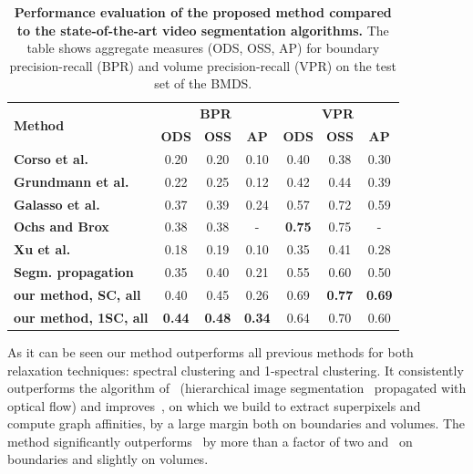 \begin{table}[htbp]
\renewcommand{\arraystretch}{1.3}
\centering
\scriptsize
\begin{tabular}{|l||c|c|c||c|c|c||}
\hline 
\multirow{2}{*}{\textbf{Method}} & \multicolumn{3}{c||}{\textbf{BPR}} & \multicolumn{3}{c||}{\textbf{VPR}}\\
\cline{2-7}
& \textbf{ODS}  & \textbf{OSS} & \textbf{AP}
& \textbf{ODS} & \textbf{OSS} & \textbf{AP}\\
\hline
\hline
\textbf{Corso et al.~\cite{Corso}} & 0.20 & 0.20 & 0.10 & 0.40 &0.38 & 0.30 \\
\hline 
\textbf{Grundmann et al.~\cite{Grundmann10}} & 0.22 & 0.25 & 0.12 & 0.42 & 0.44 & 0.39\\
\hline
\textbf{Galasso et al.~\cite{GalassoCS12}} & 0.37 & 0.39 & 0.24 & 0.57 &0.72 & 0.59 \\
\hline
\textbf{Ochs and Brox~\cite{Ochs11,Ochs12}} & 0.38 & 0.38 & - & \textbf{0.75} & 0.75 & - \\
\hline
\textbf{Xu et al.~\cite{XuXiong12}} & 0.18 & 0.19 & 0.10 & 0.35 & 0.41 & 0.28 \\
\hline
\textbf{Segm. propagation~\cite{Galasso13}} & 0.35 & 0.40 & 0.21 & 0.55 & 0.60 & 0.50 \\
\hline\hline
\textbf{our method, SC, all} & 0.40 & 0.45 & 0.26 & 0.69 & \textbf{0.77} & \textbf{0.69} \\
\hline
\textbf{our method, 1SC, all} & \textbf{0.44} & \textbf{0.48} & \textbf{0.34} & 0.64 & 0.70 & 0.60 \\
\hline
\end{tabular}
 \caption{{\bf Performance evaluation of the proposed method compared to the state-of-the-art video segmentation algorithms.} 
The table shows aggregate measures (ODS, OSS, AP) for boundary precision-recall (BPR) and volume precision-recall (VPR) on the test set of the BMDS.}
\label{tab:ml_other_comparison}
\end{table}

As it can be seen our method outperforms all previous methods for both relaxation techniques: spectral clustering and 1-spectral clustering. 
It consistently outperforms the algorithm of~\cite{Galasso13} (hierarchical image segmentation~\cite{Arbelaez11} propagated with optical flow) and improves~\cite{GalassoCS12}, 
on which we build to extract superpixels and compute graph affinities, by a large margin both on boundaries and volumes.
The method significantly outperforms~\cite{Corso,Grundmann10} by more than a factor of two and~\cite{Ochs11,Ochs12} on boundaries and slightly on volumes.
